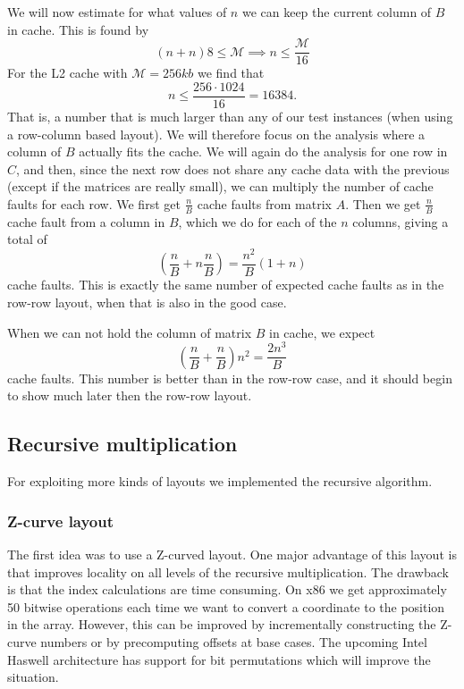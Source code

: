 We will now estimate for what values of $n$ we can keep the current
column of $B$ in cache. This is found by
\[
(n + n)8 \leq \mathcal{M} \implies n \leq \frac{\mathcal{M}}{16}
\]
For the L2 cache with $\mathcal{M} = 256kb$ we find that
\[
n \leq \frac{256 \cdot 1024}{16} = 16384.
\]
That is, a number that is much larger than any of our test instances
(when using a row-column based layout). We will therefore focus on the
analysis where a column of $B$ actually fits the cache. We will again
do the analysis for one row in $C$, and then, since the next row does
not share any cache data with the previous (except if the matrices are
really small), we can multiply the number of cache faults for each
row. We first get $\frac{n}{B}$ cache faults from matrix $A$. Then we
get $\frac{n}{B}$ cache fault from a column in $B$, which we do for
each of the $n$ columns, giving a total of
\[
\left( \frac{n}{B} + n \frac{n}{B} \right) = \frac{n^2}{B}\left(1 + n \right)
\]
cache faults. This is exactly the same number of expected cache faults
as in the row-row layout, when that is also in the good case.

When we can not hold the column of matrix $B$ in cache, we expect
\[
\left( \frac{n}{B} + \frac{n}{B} \right) n^2 = \frac{2n^3}{B}
\]
cache faults. This number is better than in the row-row case, and it
should begin to show much later then the row-row layout.

\subsection{Recursive multiplication}

For exploiting more kinds of layouts we implemented the recursive algorithm.

\subsubsection{Z-curve layout}

The first idea was to use a Z-curved layout. One major advantage of this layout is that improves locality on all levels of the recursive multiplication. The drawback is that the index calculations are time consuming. On x86 we get approximately 50 bitwise operations each time we want to convert a coordinate to the position in the array. However, this can be improved by incrementally constructing the Z-curve numbers or by precomputing offsets at base cases. The upcoming Intel Haswell architecture has support for bit permutations which will improve the situation.


